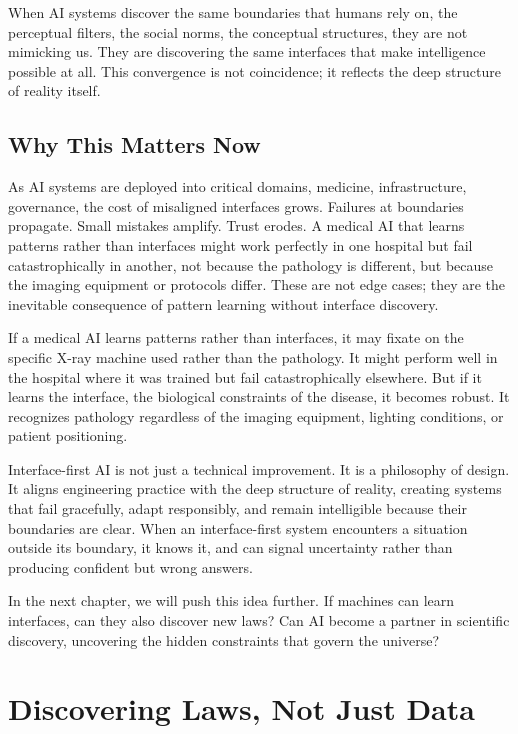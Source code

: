 \documentclass[
  openright]{book}
\begin{document}
When AI systems discover the same boundaries that humans rely on, the
perceptual filters, the social norms, the conceptual structures, they
are not mimicking us. They are discovering the same interfaces that make
intelligence possible at all. This convergence is not coincidence; it
reflects the deep structure of reality itself.

\section{Why This Matters Now}\label{why-this-matters-now-1}

As AI systems are deployed into critical domains, medicine,
infrastructure, governance, the cost of misaligned interfaces grows.
Failures at boundaries propagate. Small mistakes amplify. Trust erodes.
A medical AI that learns patterns rather than interfaces might work
perfectly in one hospital but fail catastrophically in another, not
because the pathology is different, but because the imaging equipment or
protocols differ. These are not edge cases; they are the inevitable
consequence of pattern learning without interface discovery.

If a medical AI learns patterns rather than interfaces, it may fixate on
the specific X-ray machine used rather than the pathology. It might
perform well in the hospital where it was trained but fail
catastrophically elsewhere. But if it learns the interface, the
biological constraints of the disease, it becomes
robust. It recognizes pathology regardless of the imaging equipment,
lighting conditions, or patient positioning.

Interface-first AI is not just a technical improvement. It is a
philosophy of design. It aligns engineering practice with the deep
structure of reality, creating systems that fail gracefully, adapt
responsibly, and remain intelligible because their boundaries are clear.
When an interface-first system encounters a situation outside its
boundary, it knows it, and can signal uncertainty rather than producing
confident but wrong answers.

In the next chapter, we will push this idea further. If machines can
learn interfaces, can they also discover new laws? Can AI become a
partner in scientific discovery, uncovering the hidden constraints that
govern the universe?

\chapter{\texorpdfstring{Discovering Laws, Not Just
Data}{Discovering Laws, Not Just Data}}\label{discovering-laws-not-just-data}
\end{document}
